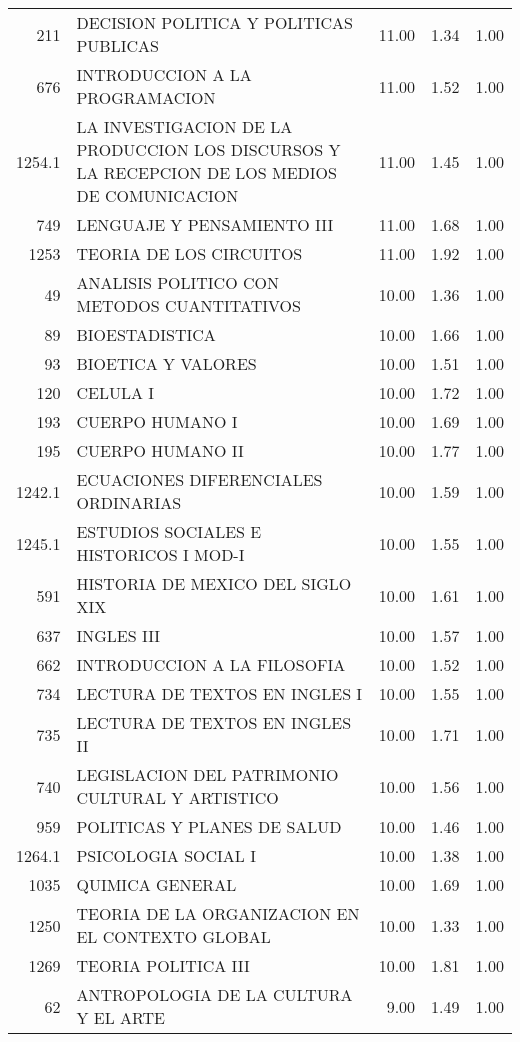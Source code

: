 \documentclass[12pt]{article}
\begin{document}
\begin{table}[ht]
\begin{tabular}{rlrrr}
  211 & DECISION POLITICA Y POLITICAS PUBLICAS & 11.00 & 1.34 & 1.00 \\ 
  676 & INTRODUCCION A LA PROGRAMACION & 11.00 & 1.52 & 1.00 \\ 
  1254.1 & LA INVESTIGACION DE LA PRODUCCION LOS DISCURSOS Y LA RECEPCION DE LOS MEDIOS DE COMUNICACION & 11.00 & 1.45 & 1.00 \\ 
  749 & LENGUAJE Y PENSAMIENTO III & 11.00 & 1.68 & 1.00 \\ 
  1253 & TEORIA DE LOS CIRCUITOS & 11.00 & 1.92 & 1.00 \\ 
  49 & ANALISIS POLITICO CON METODOS CUANTITATIVOS & 10.00 & 1.36 & 1.00 \\ 
  89 & BIOESTADISTICA & 10.00 & 1.66 & 1.00 \\ 
  93 & BIOETICA Y VALORES & 10.00 & 1.51 & 1.00 \\ 
  120 & CELULA I & 10.00 & 1.72 & 1.00 \\ 
  193 & CUERPO HUMANO I & 10.00 & 1.69 & 1.00 \\ 
  195 & CUERPO HUMANO II & 10.00 & 1.77 & 1.00 \\ 
  1242.1 & ECUACIONES DIFERENCIALES ORDINARIAS & 10.00 & 1.59 & 1.00 \\ 
  1245.1 & ESTUDIOS SOCIALES E HISTORICOS I MOD-I & 10.00 & 1.55 & 1.00 \\ 
  591 & HISTORIA DE MEXICO DEL SIGLO XIX & 10.00 & 1.61 & 1.00 \\ 
  637 & INGLES III & 10.00 & 1.57 & 1.00 \\ 
  662 & INTRODUCCION A LA FILOSOFIA & 10.00 & 1.52 & 1.00 \\ 
  734 & LECTURA DE TEXTOS EN INGLES I & 10.00 & 1.55 & 1.00 \\ 
  735 & LECTURA DE TEXTOS EN INGLES II & 10.00 & 1.71 & 1.00 \\ 
  740 & LEGISLACION DEL PATRIMONIO CULTURAL Y ARTISTICO & 10.00 & 1.56 & 1.00 \\ 
  959 & POLITICAS Y PLANES DE SALUD & 10.00 & 1.46 & 1.00 \\ 
  1264.1 & PSICOLOGIA SOCIAL I & 10.00 & 1.38 & 1.00 \\ 
  1035 & QUIMICA GENERAL & 10.00 & 1.69 & 1.00 \\ 
  1250 & TEORIA DE LA ORGANIZACION EN EL CONTEXTO GLOBAL & 10.00 & 1.33 & 1.00 \\ 
  1269 & TEORIA POLITICA III & 10.00 & 1.81 & 1.00 \\ 
  62 & ANTROPOLOGIA DE LA CULTURA Y EL ARTE & 9.00 & 1.49 & 1.00 \\ 

\end{tabular}
\end{table}
\end{document}
